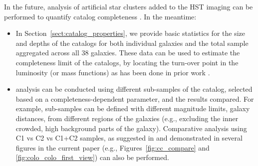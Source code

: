 \documentclass[linenumbers]{aastex63}
\begin{document}
In the future, analysis of artificial star clusters added to the HST imaging can be performed to quantify catalog completeness \citep[e.g.,][]{adamo_legacy_2017, tang_cluster_2023}.  In the meantime:
\begin{itemize}
\item In Section~\ref{sect:catalog_properties}, we provide basic statistics for the size and depths of the catalogs for both individual galaxies and the total sample aggregated across all 38 galaxies.  These data can be used to estimate the completeness limit of the catalogs, by locating the turn-over point in the luminosity (or mass functions) as has been done in prior work \citep[e.g.,][]{mayya_hst_2008, ryon_effective_2017, cook_star_2019, cuevas-otahola_cluster_2023}.
\item analysis can be conducted using different sub-samples of the catalog, selected based on a completeness-dependent parameter, and the results compared.  For example, sub-samples can be defined with different magnitude limits, galaxy distances, from different regions of the galaxies (e.g., excluding the inner crowded, high background parts of the galaxy).  Comparative analysis using C1 vs C2 vs C1+C2 samples, as suggested in \citet{whitmore_star_2021} and demonstrated in several figures in the current paper (e.g., Figures~\ref{fig:cc_compare} and \ref{fig:colo_colo_first_view}) can also be performed.
\end{itemize}
\end{document}
